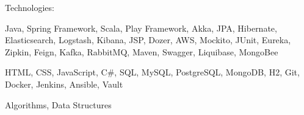 
\begin{cvskills}
  \cvskill
    {Technologies:}
    {
      \begin{cvitems} %
        \item {Java, Spring Framework, Scala, Play Framework, Akka, JPA, Hibernate, Elasticsearch, Logstash, Kibana, JSP, Dozer, AWS, Mockito, JUnit, Eureka, Zipkin, Feign, Kafka, RabbitMQ, Maven, Swagger, Liquibase, MongoBee}
        \item {HTML, CSS, JavaScript, C\#, SQL, MySQL, PostgreSQL, MongoDB, H2, Git, Docker, Jenkins, Ansible, Vault}
                \item {Algorithms, Data Structures}
      \end{cvitems}
    }
\end{cvskills}
